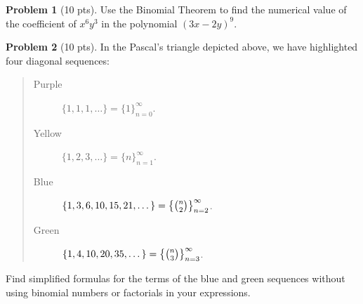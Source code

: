 \documentclass[11pt]{article}
\theoremstyle{definition}
\newtheorem{problem}{Problem}
\theoremstyle{theorem}
\begin{document}
\begin{problem}[10 pts]
  Use the Binomial Theorem to find the numerical value of the coefficient of $x^6 y^3$ in the polynomial $(3x-2y)^9$.
\end{problem}

\begin{problem}[10 pts]
  In the Pascal's triangle depicted above, we have highlighted four diagonal sequences:
  \begin{quote}
    \begin{description}
    \item[Purple] $\{ 1, 1, 1, \dotsc \} = \{ 1 \}_{n=0}^\infty$.
    \item[Yellow] $\{ 1, 2, 3, \dotsc \} = \{ n \}_{n=1}^\infty$.
    \item[Blue] $\{1, 3, 6, 10, 15, 21, \dotsc \} = \big\{ \tbinom{n}{2} \big\}_{n=2}^\infty$.
    \item[Green] $\{ 1, 4, 10, 20, 35, \dotsc \} = \big\{ \tbinom{n}{3} \big\}_{n=3}^\infty$.
    \end{description}
  \end{quote}
  Find simplified formulas for the terms of the blue and green sequences without using binomial numbers or factorials in
  your expressions.
  
\end{problem}
\end{document}
